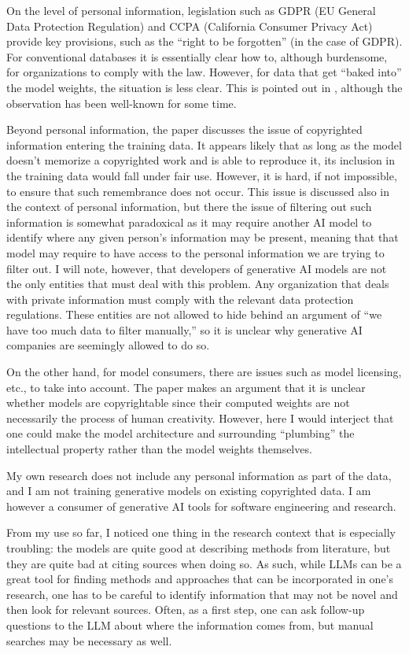 \documentclass[a4paper,11pt]{article}
\begin{document}
On the level of personal information, legislation such as GDPR (EU General Data Protection Regulation) and CCPA (California Consumer Privacy Act) provide key provisions, such as the ``right to be forgotten'' (in the case of GDPR). For conventional databases it is essentially clear how to, although burdensome, for organizations to comply with the law. However, for data that get ``baked into'' the model weights, the situation is less clear. This is pointed out in \cite{herbold2024legal}, although the observation has been well-known for some time. 

Beyond personal information, the paper discusses the issue of copyrighted information entering the training data. It appears likely that as long as the model doesn't memorize a copyrighted work and is able to reproduce it, its inclusion in the training data would fall under fair use. However, it is hard, if not impossible, to ensure that such remembrance does not occur. This issue is discussed also in the context of personal information, but there the issue of filtering out such information is somewhat paradoxical as it may require another AI model to identify where any given person's information may be present, meaning that that model may require to have access to the personal information we are trying to filter out. I will note, however, that developers of generative AI models are not the only entities that must deal with this problem. Any organization that deals with private information must comply with the relevant data protection regulations. These entities are not allowed to hide behind an argument of ``we have too much data to filter manually,'' so it is unclear why generative AI companies are seemingly allowed to do so.

On the other hand, for model consumers, there are issues such as model licensing, etc., to take into account. The paper makes an argument that it is unclear whether models are copyrightable since their computed weights are not necessarily the process of human creativity. However, here I would interject that one could make the model architecture and surrounding ``plumbing'' the intellectual property rather than the model weights themselves.

My own research does not include any personal information as part of the data, and I am not training generative models on existing copyrighted data. I am however a consumer of generative AI tools for software engineering and research. 

From my use so far, I noticed one thing in the research context that is especially troubling: the models are quite good at describing methods from literature, but they are quite bad at citing sources when doing so. As such, while LLMs can be a great tool for finding methods and approaches that can be incorporated in one's research, one has to be careful to identify information that may not be novel and then look for relevant sources. Often, as a first step, one can ask follow-up questions to the LLM about where the information comes from, but manual searches may be necessary as well.
\end{document}
